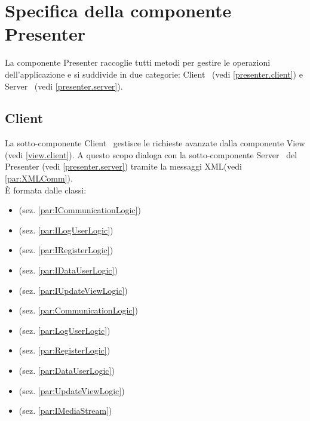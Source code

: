 \section{Specifica della componente Presenter} {

	La componente Presenter raccoglie tutti metodi per gestire le operazioni dell'applicazione e si suddivide in due categorie: Client\g~ (vedi \ref{presenter.client}) e Server\g~ (vedi \ref{presenter.server}).

	\subsection{Client}{\label{presenter.client}

	La sotto-componente Client\g~ gestisce le richieste avanzate dalla componente View (vedi \ref{view.client}). A questo scopo dialoga con la sotto-componente Server\g~ del Presenter (vedi \ref{presenter.server}) tramite la messaggi XML\g  (vedi  \ref{par:XMLComm}).\\
	\`E formata dalle classi:
	\begin{itemize}
		\item[]  (sez. \ref{par:ICommunicationLogic})
		\item[]  (sez. \ref{par:ILogUserLogic})
		\item[]  (sez. \ref{par:IRegisterLogic})
		\item[]  (sez. \ref{par:IDataUserLogic})
		\item[]  (sez. \ref{par:IUpdateViewLogic})
		\item[]  (sez. \ref{par:CommunicationLogic})
		\item[]  (sez. \ref{par:LogUserLogic})
		\item[]  (sez. \ref{par:RegisterLogic})
		\item[]  (sez. \ref{par:DataUserLogic})
		\item[]  (sez. \ref{par:UpdateViewLogic})
		\item[]  (sez. \ref{par:IMediaStream})

\end{itemize}}}
